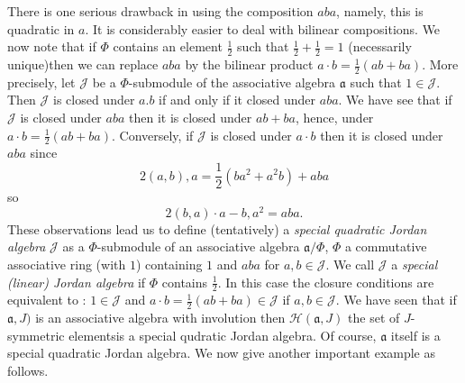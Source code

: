 There is one serious drawback in using the composition $aba$, namely,
this is quadratic in $a$. It is considerably easier to deal with
bilinear compositions. We now note that if $\Phi$ contains an element
$\frac{1}{2}$ such that $\frac{1}{2}+\frac{1}{2}=1$ (necessarily
unique)then we can replace $aba$ by the bilinear product $a\cdot
b=\frac{1}{2}(ab+ba)$. More precisely, let $\mathscr{J}$ be a
$\Phi$-submodule of the associative algebra $\mathfrak{a}$ such that
$1\in \mathscr{J}$. Then $\mathscr{J}$ is closed under $a.b$ if and
only if it closed under $aba$. We have see that if $\mathscr{J}$ is
closed under $aba$ then it is closed under $ab+ba$, hence, under
$a\cdot b=\frac{1}{2}(ab+ba)$. Conversely, if $\mathscr{J}$ is closed
under $a\cdot b$ then it is closed under $aba$ since 
$$
2(a,b),a=\frac{1}{2}(b a^{2}+a^{2}b)+aba
$$
so
\begin{equation*}
  2(b,a)\cdot a-b,a^{2}=aba.\tag{1}\label{c1:eq1}
\end{equation*}
These observations lead us to define (tentatively) a {\em special quadratic Jordan algebra} $\mathscr{J}$ as a $\Phi$-submodule of an associative algebra $\mathfrak{a}/\Phi$, $\Phi$ a commutative associative ring (with $1$) containing $1$ and $aba$ for $a,b\in \mathscr{J}$. We call $\mathscr{J}$ a {\em special (linear) Jordan algebra} if $\Phi$ contains $\frac{1}{2}$. In this case the closure conditions are equivalent to : $1\in \mathscr{J}$ and $a\cdot b=\frac{1}{2}(ab+ba)\in \mathscr{J}$ if $a,b\in \mathscr{J}$. We have seen that if $\mathfrak{a}, J)$ is an associative algebra with involution then $\mathscr{H}(\mathfrak{a},J)$ the set of $J$-symmetric elements\pageoriginale is a special qudratic Jordan algebra. Of course, $\mathfrak{a}$ itself is a special quadratic Jordan algebra. We now give another important example as follows.

